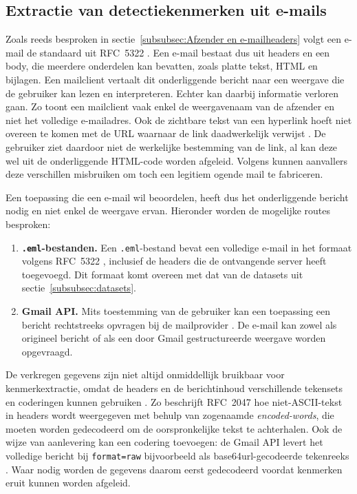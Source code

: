 \subsection{Extractie van detectiekenmerken uit e-mails}
\label{subsec:extractie-van-detectiekenmerken}

Zoals reeds besproken in sectie~\ref{subsubsec:Afzender en e-mailheaders} volgt een e-mail de standaard uit RFC~5322 \autocite{Resnick2008}. Een e-mail bestaat dus uit headers en een body, die meerdere onderdelen kan bevatten, zoals platte tekst, HTML en bijlagen. Een mailclient vertaalt dit onderliggende bericht naar een weergave die de gebruiker kan lezen en interpreteren. Echter kan daarbij informatie verloren gaan. Zo toont een mailclient vaak enkel de weergavenaam van de afzender en niet het volledige e-mailadres. Ook de zichtbare tekst van een hyperlink hoeft niet overeen te komen met de URL waarnaar de link daadwerkelijk verwijst \autocite{Veit2025}. De gebruiker ziet daardoor niet de werkelijke bestemming van de link, al kan deze wel uit de onderliggende HTML-code worden afgeleid. Volgens \textcite{Chen2020} kunnen aanvallers deze verschillen misbruiken om toch een legitiem ogende mail te fabriceren.

Een toepassing die een e-mail wil beoordelen, heeft dus het onderliggende bericht nodig en niet enkel de weergave ervan. Hieronder worden de mogelijke routes besproken:

\begin{enumerate}
    \item \textbf{\texttt{.eml}-bestanden.} Een \texttt{.eml}-bestand bevat een volledige e-mail in het formaat volgens RFC~5322 \parencite{Resnick2008}, inclusief de headers die de ontvangende server heeft toegevoegd. Dit formaat komt overeen met dat van de datasets uit sectie~\ref{subsubsec:datasets}.
    \item \textbf{Gmail API.} Mits toestemming van de gebruiker kan een toepassing een bericht rechtstreeks opvragen bij de mailprovider . De e-mail kan zowel als origineel bericht of als een door Gmail gestructureerde weergave worden opgevraagd.
\end{enumerate}

De verkregen gegevens zijn niet altijd onmiddellijk bruikbaar voor kenmerkextractie, omdat de headers en de berichtinhoud verschillende tekensets en coderingen kunnen gebruiken \autocite{Koide2025}. Zo beschrijft RFC~2047 \autocite{Moore1996} hoe niet-ASCII-tekst in headers wordt weergegeven met behulp van zogenaamde \emph{encoded-words}, die moeten worden gedecodeerd om de oorspronkelijke tekst te achterhalen. Ook de wijze van aanlevering kan een codering toevoegen: de Gmail API levert het volledige bericht bij \texttt{format=raw} bijvoorbeeld als base64url-gecodeerde tekenreeks . Waar nodig worden de gegevens daarom eerst gedecodeerd voordat kenmerken eruit kunnen worden afgeleid.